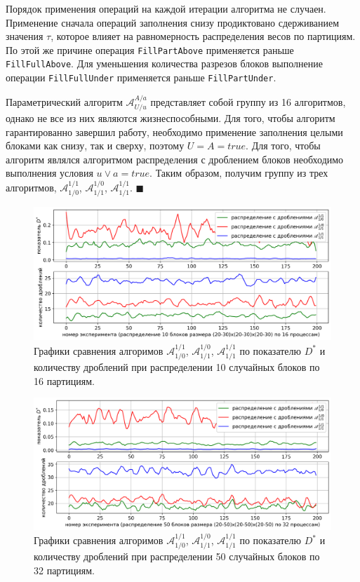 Порядок применения операций на каждой итерации алгоритма не случаен.
Применение сначала операций заполнения снизу продиктовано сдерживанием значения $\tau$, которое влияет на равномерность распределения весов по партициям.
По этой же причине операция \texttt{FillPartAbove} применяется раньше \texttt{FillFullAbove}.
Для уменьшения количества разрезов блоков выполнение операции \texttt{FillFullUnder} применяется раньше \texttt{FillPartUnder}.

Параметрический алгоритм $\mathscr{A}_{U/u}^{A/a}$ представляет собой группу из 16 алгоритмов, однако не все из них являются жизнеспособными.
Для того, чтобы алгоритм гарантированно завершил работу, необходимо применение заполнения целыми блоками как снизу, так и сверху, поэтому $U = A = true$.
Для того, чтобы алгоритм являлся алгоритмом распределения с дроблением блоков необходимо выполнения условия $u \vee a = true$.
Таким образом, получим группу из трех алгоритмов, $\mathscr{A}_{1/0}^{1/1}$, $\mathscr{A}_{1/1}^{1/0}$, $\mathscr{A}_{1/1}^{1/1}$.
$\blacksquare$\\

\begin{figure}[!h]
\centering
\includegraphics[width=1.0\textwidth]{fig/par_chart_distr_10_20_30_16.png}
\singlespacing
{}\caption{Графики сравнения алгоримов $\mathscr{A}_{1/0}^{1/1}$, $\mathscr{A}_{1/1}^{1/0}$, $\mathscr{A}_{1/1}^{1/1}$ по показателю $D^{*}$ и количеству дроблений при распределении 10 случайных блоков по 16 партициям.}
\label{fig:par_chart_distr_10_20_30_16}
\end{figure}

\begin{figure}[!h]
\centering
\includegraphics[width=1.0\textwidth]{fig/par_chart_distr_50_20_50_32.png}
\singlespacing
{}\caption{Графики сравнения алгоримов $\mathscr{A}_{1/0}^{1/1}$, $\mathscr{A}_{1/1}^{1/0}$, $\mathscr{A}_{1/1}^{1/1}$ по показателю $D^{*}$ и количеству дроблений при распределении 50 случайных блоков по 32 партициям.}
\label{fig:par_chart_distr_50_20_50_32}
\end{figure}

